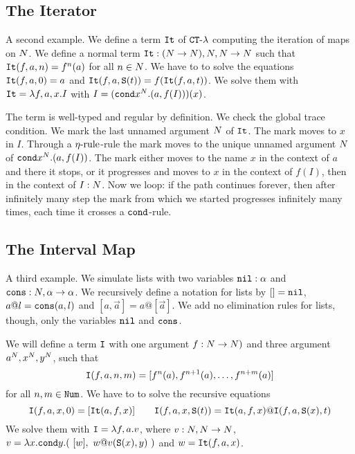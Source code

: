 \documentclass{article}
\begin{document}


\subsection{The Iterator}
A second example. We define a term ${\tt It}$ of  ${ {\tt CT} \mbox{-} \lambda}$ computing the iteration of maps on ${N}$.
We define a normal term ${\tt It}:({N} \rightarrow {N}), {N},{N} \rightarrow {N}$ such that
${\tt It}(f,a,n)=f^n(a)$ for all $n \in {N}$. 
We have to to solve the equations ${\tt It}(f,a,0) = a$ and ${\tt It}(f,a,{\tt S} (t)) = f({\tt It}(f,a,t))$.
We solve them with ${\tt It} = \lambda f, a, x.I$
with $I = ({\tt cond} x^{N}. (a, f(I) ))(x)$.

The term is well-typed and regular by definition. We check the global trace condition. 
We mark the last unnamed argument ${N}$ of ${\tt It}$. The mark moves to $x$ in $I$.
 Through a ${\eta\mbox{-rule}}$-rule the mark moves to the unique unnamed argument ${N}$ of  
$ {\tt cond} x^{N}. (a, f(I) )$.
The mark either moves to the name $x$ in the context of $a$ and there it stops, or 
it progresses and moves to $x$ in the context of $f(I)$, then in the context of $I:{N}$.
Now we loop: if the path continues forever, then after infinitely many step the mark from which we started 
progresses infinitely many times, each time it crosses a ${\tt cond}$-rule.



\subsection{The Interval Map}
A third example. We simulate lists with two variables ${\tt nil}:\alpha$ and 
${\tt cons}:{N},\alpha \rightarrow \alpha$. We recursively define a notation for lists by $[]={\tt nil}$,
$a @ l={\tt cons}(a,l)$ and $[a,\vec{a}] = a @ [\vec{a}]$. We add no elimination rules for lists, though,
only the variables ${\tt nil}$ and ${\tt cons}$.

We will define a term ${\tt I}$ with one argument $f:{N} \rightarrow {N})$ and three argument
$a^{N},x^{N},y^{N}$, such that 
$$
{\tt I}(f,a,n,m) = [f^n(a), f^{n+1}(a), \ldots, f^{n+m}(a)]
$$ 
for all $n,m \in {\tt Num}$. 
We have to to solve the recursive equations 
$$
\Interval(f,a,x,0) = [\Iter(a,f,x)]
\ \ \ \ \ \ 
\Interval(f,a,x,\Succ (t)) = \Iter(a,f,x) @ \Interval(f,a,\Succ(x),t)
$$ 
We solve them with ${\tt I} = \lambda f,a.v$,
where $v:{N},{N}\rightarrow {N}$, 
$v = \lambda x.{\tt cond} y. (\ [w],  \  w @ v({\tt S} (x),y) \ )$ and $w={\tt It}(f,a,x)$.
\end{document}
